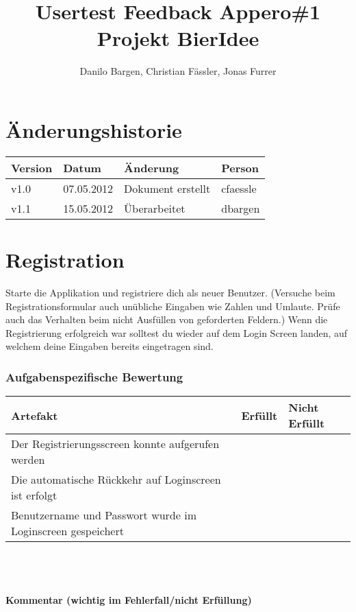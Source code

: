 \documentclass[10pt,a4paper]{scrartcl}
\author{Danilo Bargen, Christian Fässler, Jonas Furrer}
\title{Usertest Feedback Appero\#1\\ Projekt BierIdee}
\begin{document}
\begin{titlepage}
	\maketitle
	\vspace{120mm}
	\thispagestyle{empty} %
\end{titlepage}

\tableofcontents
\newpage

\section*{Änderungshistorie}
\begin{tabular}{p{}p{}p{}p{}}
\toprule
\textbf{Version} & \textbf{Datum} & \textbf{Änderung} & \textbf{Person} \\  
\midrule
v1.0 & 07.05.2012 & Dokument erstellt & cfaessle \\  
\hline 
v1.1 & 15.05.2012 & Überarbeitet & dbargen \\  
\hline 
\bottomrule
\end{tabular} 
\newpage

\section{Registration}
Starte die Applikation und registriere dich als neuer Benutzer. 
(Versuche beim Registrationsformular auch unübliche Eingaben wie Zahlen und Umlaute. Prüfe auch das Verhalten beim nicht Ausfüllen von geforderten Feldern.)
Wenn die Registrierung erfolgreich war solltest du wieder auf dem Login Screen landen, auf welchem deine Eingaben bereits eingetragen sind.

\subsubsection*{Aufgabenspezifische Bewertung}
\begin{tabular}{|p{}|p{}|p{}|}
\hline 
\textbf{Artefakt} & \textbf{Erfüllt} & \textbf{Nicht Erfüllt} \\ 
\hline 
Der Registrierungsscreen konnte aufgerufen werden &  &  \\ 
\hline 
Die automatische Rückkehr auf Loginscreen ist erfolgt &  &  \\ 
\hline 
Benutzername und Passwort wurde im Loginscreen gespeichert &  &  \\ 
\hline 
\end{tabular}
\\
\\
\\
\textbf{Kommentar (wichtig im Fehlerfall/nicht Erfüllung)}
\vspace*{4cm}
\end{document}
